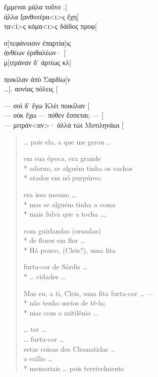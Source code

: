 {\begin{gkverse}
ἔ̣μμεναι μά̣λα τοῦτο .[\\
ἀ̣λλα ξανθοτέρα<ι>ς ἔχη[\\
τ̣α<ὶ>ς κόμα<ι>ς δάϊδος προφ[

σ]τεφάνοισιν ἐπαρτία[ις\\
ἀ̣νθέων ἐριθαλέων· [ \\
μ]ι̣τράναν δ’ ἀρτίως κλ[

π̣οικίλαν ἀπὺ Σαρδίω[ν\\
\ldots{}]. αονίας πόλ{ε}ις [

\ast\quad\ast\quad\ast

--- σοὶ δ’ ἔγω Κλέι ποικίλαν [\\
--- οὐκ ἔχω --- πόθεν ἔσσεται; --- [\\
--- μιτράν<αν>· ἀλλὰ τὼι Μυτιληνάωι [
\end{gkverse}

\pagebreak

\begin{verse}
\ldots{} pois ela, a que me gerou \ldots{}


em sua época, era grande \\*
adorno, se alguém tinha os cachos\\*
atados em nó purpúreo;


era isso mesmo \ldots{} \\*
mas se alguém tinha a coma\\*
mais fulva que a tocha \ldots{},

com guirlandas (ornadas)\\*
de flores em flor \ldots{}\\*
Há pouco, (Cleis?), uma fita

furta-cor de Sárdis \ldots{}\\*
\ldots{} cidades \ldots{}

Mas eu, a ti, Cleis, uma fita furta-cor \ldots{} ---\\*
não tenho meios de tê-la; \\*
mas com o mitilênio \ldots{}

\ast\quad\ast\quad\ast

\ldots{} ter \ldots{}\\
\ldots{} furta-cor \ldots{}\\
estas coisas dos Cleanatidas \ldots{}\\
o exílio \ldots{}\\*
memoriais \ldots{} pois terrivelmente 
\end{verse}

\pagebreak

}
